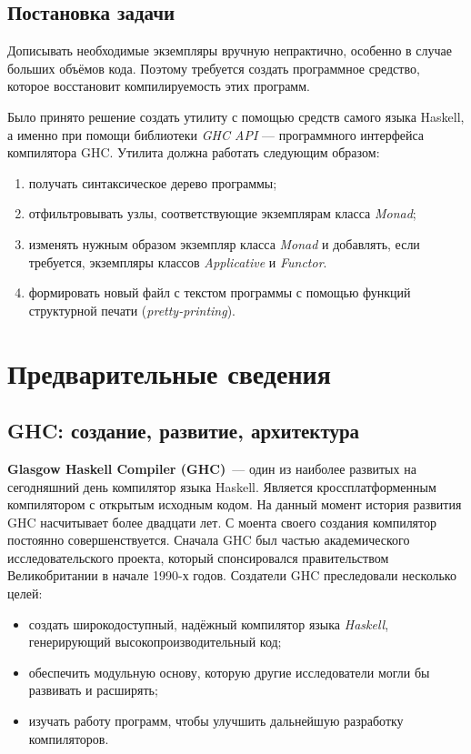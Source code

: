 \subsection*{Постановка задачи}
Дописывать необходимые экземпляры вручную непрактично, особенно в случае больших объёмов кода. Поэтому требуется создать программное средство, которое восстановит компилируемость этих программ.

Было принято решение создать утилиту с помощью средств самого языка Haskell, а именно при помощи библиотеки \textit{GHC API} --- программного интерфейса компилятора GHC. Утилита должна работать следующим образом:
\begin{enumerate}[1)]
\item получать синтаксическое дерево программы;
\item отфильтровывать узлы, соответствующие экземплярам класса \textit{Monad};
\item изменять нужным образом экземпляр класса \textit{Monad} и добавлять, если требуется, экземпляры классов \textit{Applicative} и \textit{Functor}.
\item формировать новый файл с текстом программы с помощью функций структурной печати (\textit{pretty-printing}).
\end{enumerate}


\section{Предварительные сведения}
\label{sec:prelim}

\subsection{GHC: создание, развитие, архитектура}
\textbf{Glasgow Haskell Compiler (GHC)}~--- один из наиболее развитых на сегодняшний день компилятор языка Haskell. Является кроссплатформенным компилятором с открытым исходным кодом. На данный момент история развития GHC насчитывает более двадцати лет. С моента своего создания компилятор постоянно совершенствуется. Сначала GHC был частью академического исследовательского проекта, который спонсировался правительством Великобритании в начале 1990-х годов. Создатели GHC преследовали несколько целей:
\begin{itemize}
\item создать широкодоступный, надёжный компилятор языка \textit{Haskell}, генерирующий высокопроизводительный код;
\item обеспечить модульную основу, которую другие исследователи могли бы развивать и расширять;
\item изучать работу программ, чтобы улучшить дальнейшую разработку компиляторов.
\end{itemize}

